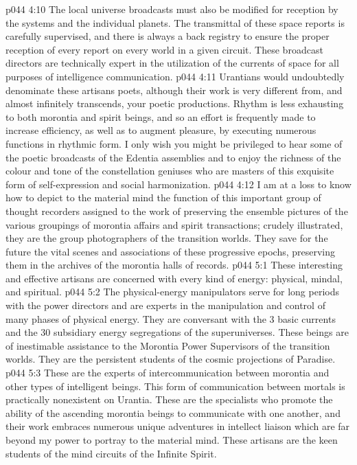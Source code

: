 \vs p044 4:10 The local universe broadcasts must also be modified for reception by the systems and the individual planets. The transmittal of these space reports is carefully supervised, and there is always a back registry to ensure the proper reception of every report on every world in a given circuit. These broadcast directors are technically expert in the utilization of the currents of space for all purposes of intelligence communication.
\vs p044 4:11 \bibnobreakspace {} Urantians would undoubtedly denominate these artisans poets, although their work is very different from, and almost infinitely transcends, your poetic productions. Rhythm is less exhausting to both morontia and spirit beings, and so an effort is frequently made to increase efficiency, as well as to augment pleasure, by executing numerous functions in rhythmic form. I only wish you might be privileged to hear some of the poetic broadcasts of the Edentia assemblies and to enjoy the richness of the colour and tone of the constellation geniuses who are masters of this exquisite form of self\hyp{}expression and social harmonization.
\vs p044 4:12 \bibnobreakspace {} I am at a loss to know how to depict to the material mind the function of this important group of thought recorders assigned to the work of preserving the ensemble pictures of the various groupings of morontia affairs and spirit transactions; crudely illustrated, they are the group photographers of the transition worlds. They save for the future the vital scenes and associations of these progressive epochs, preserving them in the archives of the morontia halls of records.
\vs p044 5:1 These interesting and effective artisans are concerned with every kind of energy: physical, mindal, and spiritual.
\vs p044 5:2 \bibnobreakspace {} The physical\hyp{}energy manipulators serve for long periods with the power directors and are experts in the manipulation and control of many phases of physical energy. They are conversant with the 3 basic currents and the 30 subsidiary energy segregations of the superuniverses. These beings are of inestimable assistance to the Morontia Power Supervisors of the transition worlds. They are the persistent students of the cosmic projections of Paradise.
\vs p044 5:3 \bibnobreakspace {} These are the experts of intercommunication between morontia and other types of intelligent beings. This form of communication between mortals is practically nonexistent on Urantia. These are the specialists who promote the ability of the ascending morontia beings to communicate with one another, and their work embraces numerous unique adventures in intellect liaison which are far beyond my power to portray to the material mind. These artisans are the keen students of the mind circuits of the Infinite Spirit.
